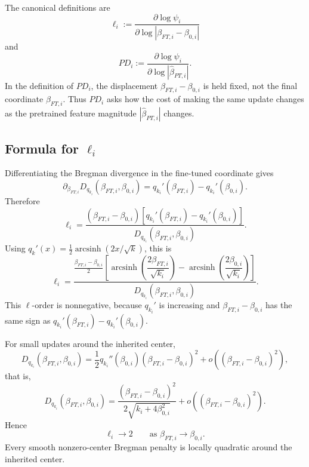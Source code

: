 \documentclass[11pt]{article}
\begin{document}
The canonical definitions are
\begin{equation}
    \boxed{
    \ell_i
    :=
    \frac{\partial\log\psi_i}{\partial\log |\beta_{FT,i}-\beta_{0,i}|}
    }
\end{equation}
and
\begin{equation}
    \boxed{
    PD_i
    :=
    \frac{\partial\log\psi_i}{\partial\log |\widehat\beta_{PT,i}|}
    }.
\end{equation}
In the definition of \(PD_i\), the displacement \(\beta_{FT,i}-\beta_{0,i}\) is held fixed, not the final coordinate \(\beta_{FT,i}\). Thus \(PD_i\) asks how the cost of making the same update changes as the pretrained feature magnitude \(|\widehat\beta_{PT,i}|\) changes.

\subsection{Formula for \texorpdfstring{\(\ell_i\)}{l-i}}

Differentiating the Bregman divergence in the fine-tuned coordinate gives
\begin{equation}
    \partial_{\beta_{FT,i}}
    D_{q_{k_i}}(\beta_{FT,i},\beta_{0,i})
    =
    q_{k_i}'(\beta_{FT,i})-q_{k_i}'(\beta_{0,i}).
\end{equation}
Therefore
\begin{equation}
    \boxed{
    \ell_i
    =
    \frac{
    (\beta_{FT,i}-\beta_{0,i})
    \left[q_{k_i}'(\beta_{FT,i})-q_{k_i}'(\beta_{0,i})\right]
    }{
    D_{q_{k_i}}(\beta_{FT,i},\beta_{0,i})
    }
    }.
\end{equation}
Using \(q_k'(x)=\tfrac12\operatorname{arcsinh}(2x/\sqrt{k})\), this is
\begin{equation}
    \boxed{
    \ell_i
    =
    \frac{
    \frac{\beta_{FT,i}-\beta_{0,i}}{2}
    \left[
    \operatorname{arcsinh}\left(\dfrac{2\beta_{FT,i}}{\sqrt{k_i}}\right)
    -
    \operatorname{arcsinh}\left(\dfrac{2\beta_{0,i}}{\sqrt{k_i}}\right)
    \right]
    }{
    D_{q_{k_i}}(\beta_{FT,i},\beta_{0,i})
    }
    }.
\end{equation}
This \(\ell\)-order is nonnegative, because \(q_{k_i}'\) is increasing and \(\beta_{FT,i}-\beta_{0,i}\) has the same sign as \(q_{k_i}'(\beta_{FT,i})-q_{k_i}'(\beta_{0,i})\).

For small updates around the inherited center,
\begin{equation}
    D_{q_{k_i}}(\beta_{FT,i},\beta_{0,i})
    =
    \frac12q_{k_i}''(\beta_{0,i})(\beta_{FT,i}-\beta_{0,i})^2
    +
    o((\beta_{FT,i}-\beta_{0,i})^2),
\end{equation}
that is,
\begin{equation}
    D_{q_{k_i}}(\beta_{FT,i},\beta_{0,i})
    =
    \frac{(\beta_{FT,i}-\beta_{0,i})^2}{2\sqrt{k_i+4\beta_{0,i}^2}}
    +
    o((\beta_{FT,i}-\beta_{0,i})^2).
\end{equation}
Hence
\begin{equation}
    \boxed{\ell_i\to2\qquad\text{as }\beta_{FT,i}\to\beta_{0,i}.}
\end{equation}
Every smooth nonzero-center Bregman penalty is locally quadratic around the inherited center.
\end{document}
